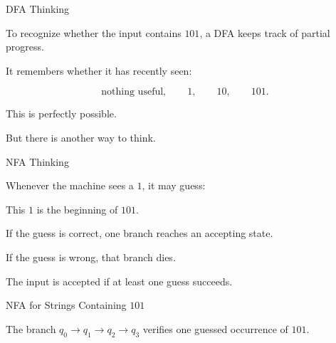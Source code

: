 \documentclass[10pt,aspectratio=169]{beamer}
\begin{document}
\begin{frame}{DFA Thinking}

To recognize whether the input contains \(101\), a DFA keeps track of partial progress.

\vspace{1em}

It remembers whether it has recently seen:

\[
\text{nothing useful},\qquad 1,\qquad 10,\qquad 101.
\]

\vspace{1em}

This is perfectly possible.

\pause

But there is another way to think.

\end{frame}

\begin{frame}{NFA Thinking}

Whenever the machine sees a \(1\), it may guess:

\begin{center}
This \(1\) is the beginning of \(101\).
\end{center}

\vspace{1em}

If the guess is correct, one branch reaches an accepting state.

If the guess is wrong, that branch dies.

\vspace{1em}

\pause
The input is accepted if at least one guess succeeds.

\end{frame}

\begin{frame}{NFA for Strings Containing \(101\)}

\begin{center}
\end{center}

\vspace{0.5em}

The branch \(q_0\to q_1\to q_2\to q_3\) verifies one guessed occurrence of \(101\).

\end{frame}
\end{document}
